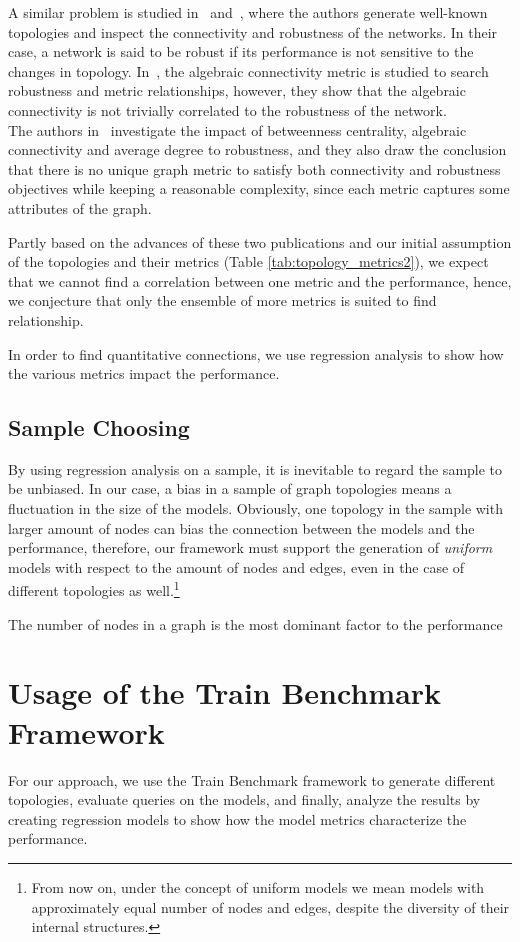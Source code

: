 A similar problem is studied in~\cite{algebraic1} and~\cite{algebraic2}, where the authors generate well-known topologies and inspect the connectivity and robustness of the networks. In their case, a network is said to be robust if its performance is not sensitive to the changes in topology. In~\cite{algebraic1}, the algebraic connectivity metric is studied to search robustness and metric relationships, however, they show that the algebraic connectivity is not trivially correlated to the robustness of the network.\\
The authors in~\cite{algebraic2} investigate the impact of betweenness centrality, algebraic connectivity and average degree to robustness, and they also draw the conclusion that there is no unique graph metric to satisfy both connectivity and robustness objectives while keeping a reasonable complexity, since each metric captures some attributes of the graph.

Partly based on the advances of these two publications and our initial assumption of the topologies and their metrics (Table \ref{tab:topology_metrics2}), we expect that we cannot find a correlation between one metric and the performance, hence, we conjecture that only the ensemble of more metrics is suited to find relationship.

In order to find quantitative connections, we use regression analysis to show how the various metrics impact the performance. 

\subsection{Sample Choosing}

By using regression analysis on a sample, it is inevitable to regard the sample to be unbiased. In our case, a bias in a sample of graph topologies means a fluctuation in the size of the models. Obviously, one topology in the sample with larger amount of nodes can bias the connection between the models and the performance, therefore, our framework must support the generation of \textit{uniform} models with respect to the amount of nodes and edges, even in the case of different topologies as well.\footnote{From now on, under the concept of uniform models we mean models with approximately equal number of nodes and edges, despite the diversity of their internal structures.}

The number of nodes in a graph is the most dominant factor to the performance

\section{Usage of the Train Benchmark Framework}
For our approach, we use the Train Benchmark framework to generate different topologies, evaluate queries on the models, and finally, analyze the results by creating regression models to show how the model metrics characterize the performance.

